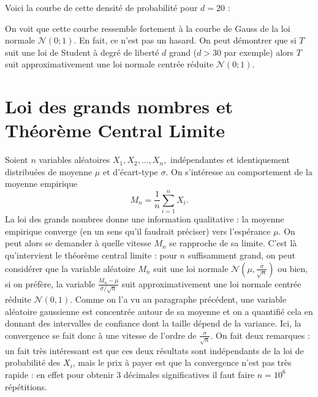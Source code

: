 \documentclass[12pt, a4paper]{book}
\numberwithin{equation}{section}
\begin{document}
\vspace{0.2cm}

\noindent Voici la courbe de cette densité de probabilité pour $d=20$ :

\begin{center}
\end{center}










On voit que cette courbe ressemble fortement à la courbe de Gauss de la loi normale $\mathcal{N}(0;1)$. En fait, ce n'est
pas un hasard. On peut démontrer que si $T$ suit une loi de Student à degré de liberté $d$ grand ($d>30$ par exemple) 
alors $T$ suit approximativement une loi normale centrée réduite $\mathcal{N}(0;1)$.


\section{Loi des grands nombres et Théorème Central Limite}  

Soient $n$ variables aléatoires  $X_1, X_2, ..., X_n,$ indépendantes  et identiquement distribuées de moyenne
$\mu$ et d'écart-type $\sigma$. On s'intéresse au comportement de la moyenne empirique  
$$
M_n=\frac{1}{n}\sum_{i=1}^{n} X_i.
$$
 La loi des grands nombres donne une information qualitative : la moyenne empirique converge (en un sens qu'il faudrait préciser) vers l'espérance $\mu$. On peut alors se demander à quelle vitesse $M_n$ se rapproche de sa limite. C'est là qu'intervient le théorème central limite : pour $n$ suffisamment
grand, on peut considérer que la variable aléatoire $M_n$ suit une loi normale
$\mathcal{N}(\mu,\frac{\sigma}{\sqrt{n}})$ ou bien, si on préfère, la variable
$\frac{M_n-\mu}{\sigma/\sqrt{n}}$ suit approximativement une loi normale centrée réduite
$\mathcal{N}(0,1)$. Comme on l'a vu au paragraphe précédent, une variable aléatoire gaussienne est concentrée autour de sa moyenne et on a quantifié cela  en donnant des intervalles de confiance dont la taille dépend de la variance. Ici, la convergence se fait donc à une vitesse de l'ordre de $\frac{\sigma}{\sqrt{n}}$. On fait deux remarques : un fait très intéressant est que ces deux résultats sont indépendants de la loi de probabilité des $X_i$, mais le prix à payer est que la convergence n'est pas très rapide : en effet pour obtenir 3 décimales significatives il faut faire $n=10^6$ répétitions.
\end{document}
